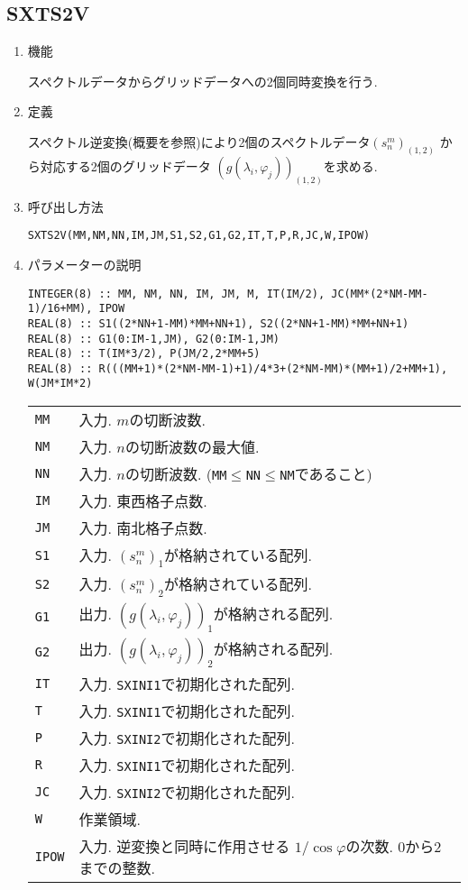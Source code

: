 \documentclass[a4j]{jsarticle}
\begin{document}

\subsection{SXTS2V}

\begin{enumerate}

\item 機能 

スペクトルデータからグリッドデータへの2個同時変換を行う.

\item 定義

スペクトル逆変換(概要を参照)により2個のスペクトルデータ$(s^m_n)_{(1,2)}$
から対応する2個のグリッドデータ
$(g(\lambda_i,\varphi_j))_{(1,2)}$を求める.

\item 呼び出し方法 

\texttt{SXTS2V(MM,NM,NN,IM,JM,S1,S2,G1,G2,IT,T,P,R,JC,W,IPOW)}
  
\item パラメーターの説明

\begin{verbatim}        
INTEGER(8) :: MM, NM, NN, IM, JM, M, IT(IM/2), JC(MM*(2*NM-MM-1)/16+MM), IPOW
REAL(8) :: S1((2*NN+1-MM)*MM+NN+1), S2((2*NN+1-MM)*MM+NN+1)
REAL(8) :: G1(0:IM-1,JM), G2(0:IM-1,JM)
REAL(8) :: T(IM*3/2), P(JM/2,2*MM+5)
REAL(8) :: R(((MM+1)*(2*NM-MM-1)+1)/4*3+(2*NM-MM)*(MM+1)/2+MM+1), W(JM*IM*2)
\end{verbatim}      

\begin{tabular}{ll}
\texttt{MM} & 入力. $m$の切断波数.\\
\texttt{NM} & 入力. $n$の切断波数の最大値.\\
\texttt{NN} & 入力. $n$の切断波数.
(\texttt{MM}$\le$\texttt{NN}$\le$\texttt{NM}であること)\\
\texttt{IM} & 入力. 東西格子点数.\\
\texttt{JM} & 入力. 南北格子点数.\\
\texttt{S1} & 入力. $(s^m_n)_1$が格納されている配列.\\
\texttt{S2} & 入力. $(s^m_n)_2$が格納されている配列.\\
\texttt{G1} & 出力. $(g(\lambda_i,\varphi_j))_1$が格納される配列.\\
\texttt{G2} & 出力. $(g(\lambda_i,\varphi_j))_2$が格納される配列.\\
\texttt{IT} & 入力. \texttt{SXINI1}で初期化された配列.\\
\texttt{T} & 入力. \texttt{SXINI1}で初期化された配列.\\
\texttt{P}  & 入力. \texttt{SXINI2}で初期化された配列.\\
\texttt{R}  & 入力. \texttt{SXINI1}で初期化された配列.\\
\texttt{JC}  & 入力. \texttt{SXINI2}で初期化された配列.\\
\texttt{W} & 作業領域.\\
\texttt{IPOW} & 入力. 逆変換と同時に作用させる
                      $1/\cos\varphi$の次数. 0から2までの整数.
\end{tabular}


\end{enumerate}
\end{document}
